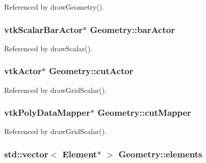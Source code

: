 Referenced by draw\-Geometry().

\hypertarget{classGeometry_af87eb1e4ab0922d0475afc67061ae30a}{
\subsubsection[{bar\-Actor}]{\setlength{\rightskip}{0pt plus 5cm}vtk\-Scalar\-Bar\-Actor$\ast$ Geometry\-::bar\-Actor\hspace{0.3cm}{\ttfamily [protected]}}}\label{classGeometry_af87eb1e4ab0922d0475afc67061ae30a}


Referenced by draw\-Scalar().

\hypertarget{classGeometry_a2a10ca6a0a6a4e1cdd5558830db80ec9}{
\subsubsection[{cut\-Actor}]{\setlength{\rightskip}{0pt plus 5cm}vtk\-Actor$\ast$ Geometry\-::cut\-Actor\hspace{0.3cm}{\ttfamily [protected]}}}\label{classGeometry_a2a10ca6a0a6a4e1cdd5558830db80ec9}


Referenced by draw\-Grid\-Scalar().

\hypertarget{classGeometry_ae6a74274d05291746f520af8083a26e7}{
\subsubsection[{cut\-Mapper}]{\setlength{\rightskip}{0pt plus 5cm}vtk\-Poly\-Data\-Mapper$\ast$ Geometry\-::cut\-Mapper\hspace{0.3cm}{\ttfamily [protected]}}}\label{classGeometry_ae6a74274d05291746f520af8083a26e7}


Referenced by draw\-Grid\-Scalar().

\hypertarget{classGeometry_acef6e83971679a9c4672c3b610acb58e}{
\subsubsection[{elements}]{\setlength{\rightskip}{0pt plus 5cm}std\-::vector$<$ {\bf Element}$\ast$ $>$ Geometry\-::elements\hspace{0.3cm}{\ttfamily [protected]}}}\label{classGeometry_acef6e83971679a9c4672c3b610acb58e}


